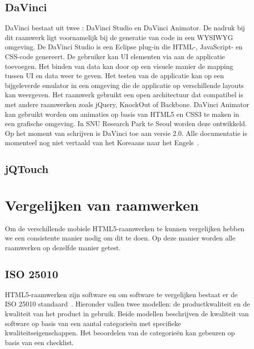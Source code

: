 \subsection{DaVinci}%
DaVinci bestaat uit twee :  DaVinci Studio en DaVinci Animator.
De nadruk bij dit raamwerk ligt voornamelijk bij de generatie van code in een WYSIWYG omgeving.
De DaVinci Studio is een Eclipse plug-in die HTML-,  JavaScript- en CSS-code genereert.
De gebruiker kan UI elementen via  aan de applicatie toevoegen.
Het binden van data kan door op een visuele manier de mapping tussen UI en data weer te geven.
Het testen van de applicatie kan op een bijgeleverde emulator in een  omgeving die de applicatie op verschillende layouts kan weergeven.
Het raamwerk gebruikt een open architectuur dat compatibel is met andere  raamwerken zoals jQuery, KnockOut of Backbone.
DaVinci Animator kan gebruikt worden om animaties op basis van HTML5 en CSS3 te maken in een grafische omgeving.
In SNU Research Park te Seoul worden deze  ontwikkeld.
Op het moment van schrijven is DaVinci toe aan versie 2.0.  
Alle documentatie is momenteel nog niet vertaald van het Koreaans naar het Engels~\cite{Incross}.


\subsection{jQTouch}%


\section{Vergelijken van raamwerken} 
\label{sec:vergelijken-raamwerken}
Om de verschillende mobiele HTML5-raamwerken te kunnen vergelijken hebben we een consistente manier nodig om dit te doen.  
Op deze manier worden alle raamwerken op dezelfde manier getest.

\subsection{ISO 25010}
HTML5-raamwerken zijn software en om software te vergelijken bestaat er de ISO 25010 standaard~\cite{Standard2010}.  
Hieronder vallen twee modellen:  de productkwaliteit en de kwaliteit van het product in gebruik.  
Beide modellen beschrijven de kwaliteit van software op basis van een aantal categorieën met specifieke kwaliteitseigenschappen. 
Het beoordelen van de categorieën kan gebeuren op basis van een checklist. 
 
